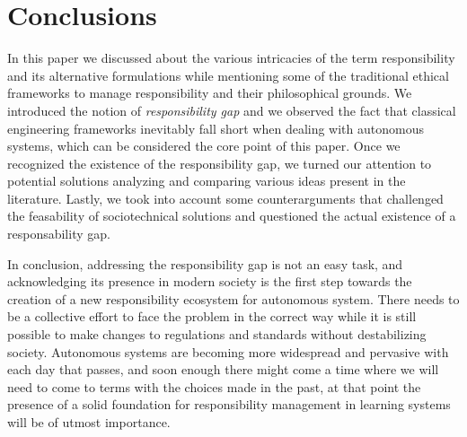 \section{Conclusions}\label{sec:conclusions}

In this paper we discussed about the various intricacies of the term responsibility and its alternative formulations while mentioning some of the traditional ethical frameworks to manage responsibility and their philosophical grounds.
We introduced the notion of \textit{responsibility gap} and we observed the fact that classical engineering frameworks inevitably fall short when dealing with autonomous systems, which can be considered the core point of this paper.
Once we recognized the existence of the responsibility gap, we turned our attention to potential solutions analyzing and comparing various ideas present in the literature.
Lastly, we took into account some counterarguments that challenged the feasability of sociotechnical solutions and questioned the actual existence of a responsability gap.

In conclusion, addressing the responsibility gap is not an easy task, and acknowledging its presence in modern society is the first step towards the creation of a new responsibility ecosystem for autonomous system.
There needs to be a collective effort to face the problem in the correct way while it is still possible to make changes to regulations and standards without destabilizing society.
Autonomous systems are becoming more widespread and pervasive with each day that passes, and soon enough there might come a time where we will need to come to terms with the choices made in the past, at that point the presence of a solid foundation for responsibility management in learning systems will be of utmost importance.